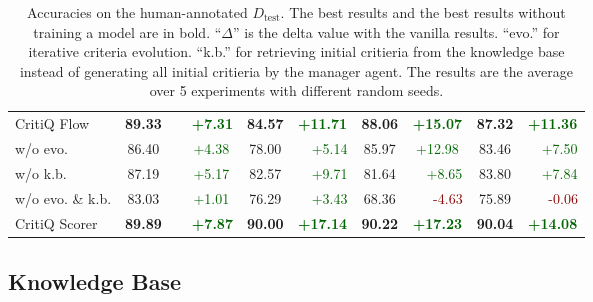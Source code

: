 \begin{table*}
\begin{tabular}{llcccccccc}
        \midrule \multicolumn{2}{l}{CritiQ Flow}     & \textbf{89.33}    & \textcolor{DarkGreen}{\textbf{\ \ +7.31}} & \textbf{84.57}                   & \textcolor{DarkGreen}{\textbf{+11.71}} & \textbf{88.06}                   & \textcolor{DarkGreen}{\textbf{+15.07}} & \textbf{87.32}                & \textcolor{DarkGreen}{\textbf{+11.36}} \\
        \multicolumn{2}{l}{\quad w/o evo.}           & 86.40             & \textcolor{DarkGreen}{\ \ +4.38}          & 78.00                            & \textcolor{DarkGreen}{\ \ +5.14}       & 85.97                            & \textcolor{DarkGreen}{+12.98}          & 83.46                         & \textcolor{DarkGreen}{\ \ +7.50}       \\
        \multicolumn{2}{l}{\quad w/o k.b.}           & 87.19             & \textcolor{DarkGreen}{\ \ +5.17}          & 82.57                            & \textcolor{DarkGreen}{\ \ +9.71}       & 81.64                            & \textcolor{DarkGreen}{\ \ +8.65}       & 83.80                         & \textcolor{DarkGreen}{\ \ +7.84}       \\
        \multicolumn{2}{l}{\quad w/o evo. \& k.b.}   & 83.03             & \textcolor{DarkGreen}{\ \ +1.01}          & 76.29                            & \textcolor{DarkGreen}{\ \ +3.43}       & 68.36                            & \textcolor{DarkRed}{\ \ \ -4.63}       & 75.89                         & \textcolor{DarkRed}{\ \ \ -0.06}       \\
        \multicolumn{2}{l}{CritiQ Scorer}            & \textbf{89.89}    & \textcolor{DarkGreen}{\textbf{\ \ +7.87}} & \textbf{90.00}                   & \textcolor{DarkGreen}{\textbf{+17.14}} & \textbf{90.22}                   & \textcolor{DarkGreen}{\textbf{+17.23}} & \textbf{90.04}                & \textcolor{DarkGreen}{\textbf{+14.08}} \\
        \bottomrule
    \end{tabular}
    \caption{Accuracies on the human-annotated $D_{\text{test}}$. The best results
    and the best results without training a model are in bold. ``$\Delta$'' is
    the delta value with the vanilla results. ``evo.'' for iterative criteria
    evolution. ``k.b.'' for retrieving initial critieria from the knowledge base
    instead of generating all initial critieria by the manager agent. The results
    are the average over 5 experiments with different random seeds.}
    \label{tab:main_results}
\end{table*}

\subsection{Knowledge Base}
\label{sec:knowledge_base}

